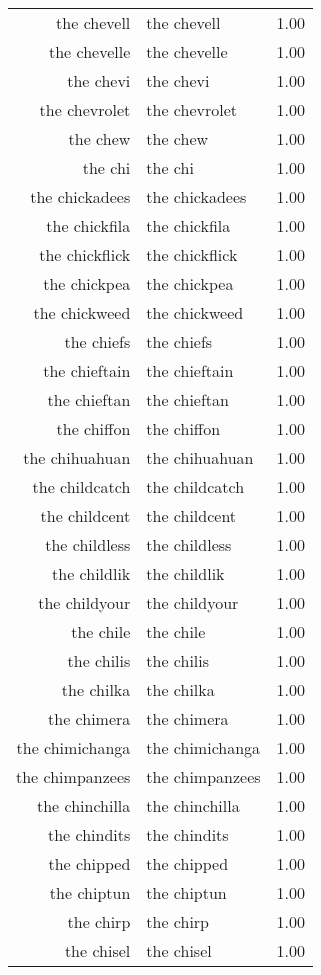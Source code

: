 \begin{table}[ht]
\begin{tabular}{rlr}
  the chevell & the chevell & 1.00 \\ 
  the chevelle & the chevelle & 1.00 \\ 
  the chevi & the chevi & 1.00 \\ 
  the chevrolet & the chevrolet & 1.00 \\ 
  the chew & the chew & 1.00 \\ 
  the chi & the chi & 1.00 \\ 
  the chickadees & the chickadees & 1.00 \\ 
  the chickfila & the chickfila & 1.00 \\ 
  the chickflick & the chickflick & 1.00 \\ 
  the chickpea & the chickpea & 1.00 \\ 
  the chickweed & the chickweed & 1.00 \\ 
  the chiefs & the chiefs & 1.00 \\ 
  the chieftain & the chieftain & 1.00 \\ 
  the chieftan & the chieftan & 1.00 \\ 
  the chiffon & the chiffon & 1.00 \\ 
  the chihuahuan & the chihuahuan & 1.00 \\ 
  the childcatch & the childcatch & 1.00 \\ 
  the childcent & the childcent & 1.00 \\ 
  the childless & the childless & 1.00 \\ 
  the childlik & the childlik & 1.00 \\ 
  the childyour & the childyour & 1.00 \\ 
  the chile & the chile & 1.00 \\ 
  the chilis & the chilis & 1.00 \\ 
  the chilka & the chilka & 1.00 \\ 
  the chimera & the chimera & 1.00 \\ 
  the chimichanga & the chimichanga & 1.00 \\ 
  the chimpanzees & the chimpanzees & 1.00 \\ 
  the chinchilla & the chinchilla & 1.00 \\ 
  the chindits & the chindits & 1.00 \\ 
  the chipped & the chipped & 1.00 \\ 
  the chiptun & the chiptun & 1.00 \\ 
  the chirp & the chirp & 1.00 \\ 
  the chisel & the chisel & 1.00 \\ 

\end{tabular}
\end{table}
